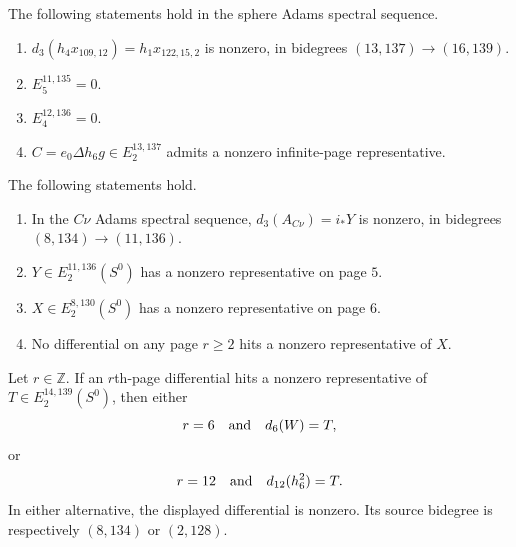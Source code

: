 \begin{theorem}
\label{frontier:AdamsCalculations:b90f6e551841}
The following statements hold in the sphere Adams spectral sequence.
\begin{enumerate}
\item $d_3(h_4x_{109,12})=h_1x_{122,15,2}$ is nonzero, in bidegrees $(13,137)\longrightarrow(16,139)$.
\item $E_5^{11,135}=0$.
\item $E_4^{12,136}=0$.
\item $C=e_0\Delta h_6g\in E_2^{13,137}$ admits a nonzero infinite-page representative.
\end{enumerate}
\end{theorem}

\begin{theorem}
\label{frontier:AdamsCalculations:6428c2d83d1a}
The following statements hold.
\begin{enumerate}
\item In the $C\nu$ Adams spectral sequence, $d_3(A_{C\nu})=i_*Y$ is nonzero, in bidegrees $(8,134)\longrightarrow(11,136)$.
\item $Y\in E_2^{11,136}(S^0)$ has a nonzero representative on page $5$.
\item $X\in E_2^{8,130}(S^0)$ has a nonzero representative on page $6$.
\item No differential on any page $r\geq2$ hits a nonzero representative of $X$.
\end{enumerate}
\end{theorem}

\begin{theorem}
\label{frontier:AdamsCalculations:f6a9ba54d96c}
Let $r\in\mathbb Z$. If an $r$th-page differential hits a nonzero representative of $T\in E_2^{14,139}(S^0)$, then either
\[r=6\quad\hbox{and}\quad d_6(W)=T,\]
or
\[r=12\quad\hbox{and}\quad d_{12}(h_6^2)=T.\]
In either alternative, the displayed differential is nonzero. Its source bidegree is respectively $(8,134)$ or $(2,128)$.
\end{theorem}

